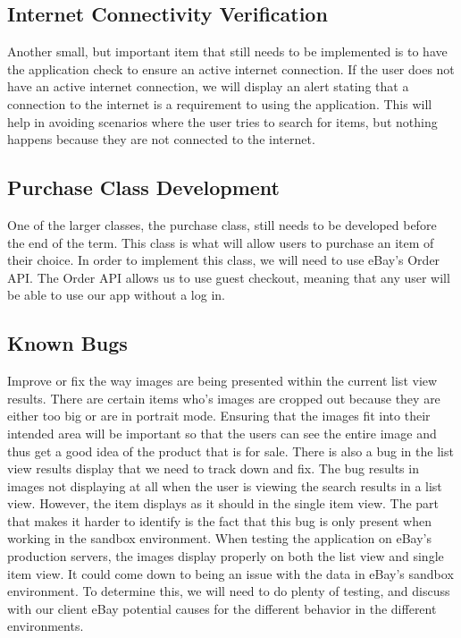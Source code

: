 \documentclass[journal,compsoc, 10pt, draftclsnofoot, onecolumn]{IEEEtran}
\begin{document}
\subsection{Internet Connectivity Verification}
Another small, but important item that still needs to be implemented is to 
have the application check to ensure an active internet connection. If the 
user does not have an active internet connection, we will display an alert 
stating that a connection to the internet is a requirement to using the 
application.  This will help in avoiding scenarios where the user tries to 
search for items, but nothing happens because they are not connected to the 
internet. 

\subsection{Purchase Class Development}
One of the larger classes, the purchase class, still needs to be developed before 
the end of the term. This class is what will allow users to purchase an item of their 
choice. In order to implement this class, we will need to use eBay's Order API. The 
Order API allows us to use guest checkout, meaning that any user will be able to 
use our app without a log in.

\subsection{Known Bugs}
Improve or fix the way images are being presented within the current list view 
results. There are certain items who's images are cropped out because they are 
either too big or are in portrait mode. Ensuring that the images fit into their 
intended area will be important so that the users can see the entire image and 
thus get a good idea of the product that is for sale. There is also a bug in 
the list view results display that we need to track down and fix. The bug 
results in images not displaying at all when the user is viewing the search 
results in a list view. However, the item displays as it should in the single 
item view. The part that makes it harder to identify is the fact that this bug 
is only present when working in the sandbox environment. When testing the 
application on eBay's production servers, the images display properly on both 
the list view and single item view. It could come down to being an issue with 
the data in eBay's sandbox environment. To determine this, we will need to do 
plenty of testing, and discuss with our client eBay potential causes for the 
different behavior in the different environments. 
\end{document}
